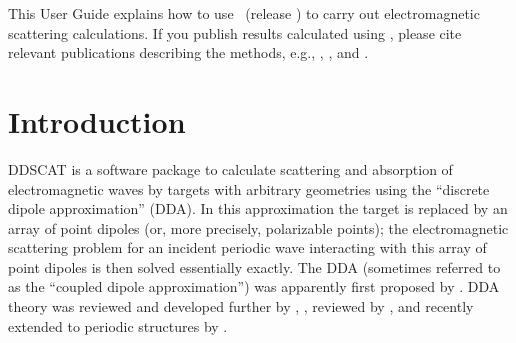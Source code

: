 {	This User Guide explains how to use \ddscatv\ (release \subvers)
        to carry out electromagnetic scattering calculations.
        If you publish results calculated using \ddscatv, 
        please cite relevant publications describing the
        methods, e.g., \citet{Draine+Flatau_1994},
        \citet{Draine+Flatau_2008a}, and \citet{Flatau+Draine_2012}.
	}

\newpage
\tableofcontents
\newpage
\section{Introduction\label{intro}}

DDSCAT is a software package to calculate scattering and
absorption of electromagnetic waves by targets with arbitrary geometries
using the ``discrete dipole approximation'' (DDA).
In this approximation the target is replaced by an array of point dipoles
(or, more precisely, polarizable points); the electromagnetic scattering
problem for an incident periodic wave interacting with this array of
point dipoles is then solved essentially exactly.
The DDA (sometimes referred to as the ``coupled dipole approximation'') 
was apparently first proposed by \citet{Purcell+Pennypacker_1973}.
DDA theory was reviewed and developed further by \citet{Draine_1988}, 
\citet{Draine+Goodman_1993}, reviewed by \citet{Draine+Flatau_1994},
and recently extended to periodic structures by
\citet{Draine+Flatau_2008a}.

